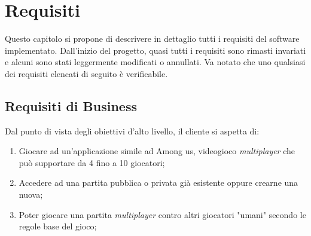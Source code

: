 \chapter{Requisiti}

Questo capitolo si propone di descrivere in dettaglio tutti i requisiti del software implementato. Dall'inizio del progetto, quasi tutti i requisiti sono rimasti invariati e alcuni sono stati leggermente modificati o annullati. Va notato che uno qualsiasi dei requisiti elencati di seguito \`e verificabile.

\section{Requisiti di Business}

Dal punto di vista degli obiettivi d’alto livello, il cliente si aspetta di:
\begin{enumerate}
\item Giocare ad un'applicazione simile ad Among us, videogioco \textit{multiplayer} che pu\`o supportare da 4 fino a 10 giocatori;
\item Accedere ad una partita pubblica o privata già esistente oppure crearne una nuova;
\item  Poter giocare una partita \textit{multiplayer} contro altri giocatori "umani" secondo le regole base del gioco;
\end{enumerate}

